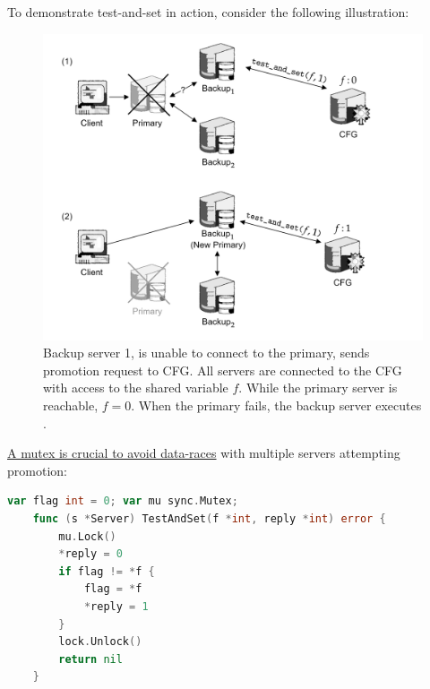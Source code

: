     \newpage
    \noindent
    To demonstrate test-and-set in action, consider the following illustration:


    \begin{figure}[h]
        
    \vspace{-1em}
        \centering
        \includegraphics[width=1\textwidth]{Sections/rep/testset.png}
        \caption{Backup server 1, is unable to connect to the primary, sends promotion request to CFG. All servers are connected to the CFG with access to the shared variable \( f \). While the primary server is reachable, \( f = 0 \). When the primary fails, the backup server executes .}
    \end{figure}

    \noindent
    \underline{A mutex is crucial to avoid data-races} with multiple servers attempting promotion:
        \begin{lstlisting}[language=Go]
    var flag int = 0; var mu sync.Mutex;
    func (s *Server) TestAndSet(f *int, reply *int) error {
        mu.Lock()
        *reply = 0
        if flag != *f {
            flag = *f
            *reply = 1
        }
        lock.Unlock()
        return nil
    }
        \end{lstlisting}

\newpage 

